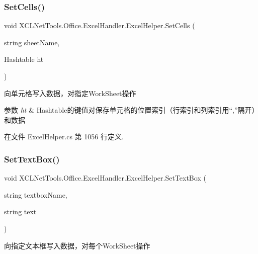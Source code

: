\subsubsection{\texorpdfstring{Set\+Cells()}{SetCells()}\hspace{0.1cm}{\footnotesize\ttfamily [6/6]}}
{\footnotesize\ttfamily void X\+C\+L\+Net\+Tools.\+Office.\+Excel\+Handler.\+Excel\+Helper.\+Set\+Cells (\begin{DoxyParamCaption}\item[{string}]{sheet\+Name,  }\item[{Hashtable}]{ht }\end{DoxyParamCaption})}



向单元格写入数据，对指定\+Work\+Sheet操作 


\begin{DoxyParams}{参数}
{\em ht} & Hashtable的键值对保存单元格的位置索引（行索引和列索引用“,”隔开）和数据\\
\hline
\end{DoxyParams}


在文件 Excel\+Helper.\+cs 第 1056 行定义.

\mbox{\label{class_x_c_l_net_tools_1_1_office_1_1_excel_handler_1_1_excel_helper_a5ae2a9cc10bd517ae122b9f74608d28f}} 
\subsubsection{\texorpdfstring{Set\+Text\+Box()}{SetTextBox()}\hspace{0.1cm}{\footnotesize\ttfamily [1/2]}}
{\footnotesize\ttfamily void X\+C\+L\+Net\+Tools.\+Office.\+Excel\+Handler.\+Excel\+Helper.\+Set\+Text\+Box (\begin{DoxyParamCaption}\item[{string}]{textbox\+Name,  }\item[{string}]{text }\end{DoxyParamCaption})}



向指定文本框写入数据，对每个\+Work\+Sheet操作 


